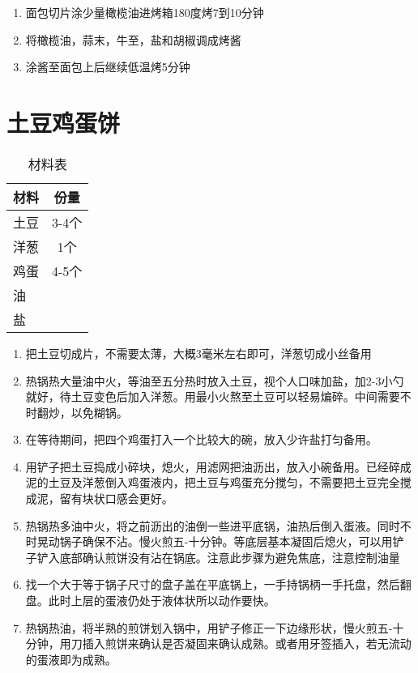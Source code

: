 \begin{enumerate}
    \item 面包切片涂少量橄榄油进烤箱180度烤7到10分钟
    \item 将橄榄油，蒜末，牛至，盐和胡椒调成烤酱
    \item 涂酱至面包上后继续低温烤5分钟
\end{enumerate}


\section{土豆鸡蛋饼}

\begin{table}[H]
    \centering
    \begin{tabular}{|l||c|}\hline
     \textbf{材料}    &  \textbf{份量}\\ \hline\hline
    土豆 &  3-4个\\ \hline
    洋葱 &  1个 \\ \hline
    鸡蛋 & 4-5个  \\ \hline
    油 &   \\ \hline
    盐 &  \\ \hline
    \end{tabular}
    \caption{材料表}
\end{table}

\begin{enumerate}
    \item 把土豆切成片，不需要太薄，大概3毫米左右即可，洋葱切成小丝备用
    \item 热锅热大量油中火，等油至五分热时放入土豆，视个人口味加盐，加2-3小勺就好，待土豆变色后加入洋葱。用最小火熬至土豆可以轻易煸碎。中间需要不时翻炒，以免糊锅。
    \item 在等待期间，把四个鸡蛋打入一个比较大的碗，放入少许盐打匀备用。
    \item 用铲子把土豆捣成小碎块，熄火，用滤网把油沥出，放入小碗备用。已经碎成泥的土豆及洋葱倒入鸡蛋液内，把土豆与鸡蛋充分搅匀，不需要把土豆完全搅成泥，留有块状口感会更好。
    \item 热锅热多油中火，将之前沥出的油倒一些进平底锅，油热后倒入蛋液。同时不时晃动锅子确保不沾。慢火煎五-十分钟。等底层基本凝固后熄火，可以用铲子铲入底部确认煎饼没有沾在锅底。注意此步骤为避免焦底，注意控制油量
    \item 找一个大于等于锅子尺寸的盘子盖在平底锅上，一手持锅柄一手托盘，然后翻盘。此时上层的蛋液仍处于液体状所以动作要快。
    \item 热锅热油，将半熟的煎饼划入锅中，用铲子修正一下边缘形状，慢火煎五-十分钟，用刀插入煎饼来确认是否凝固来确认成熟。或者用牙签插入，若无流动的蛋液即为成熟。
\end{enumerate}

